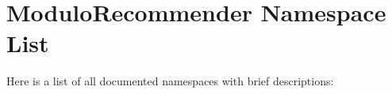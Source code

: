 \section{ModuloRecommender Namespace List}
Here is a list of all documented namespaces with brief descriptions:\begin{CompactList}
\item{}
\end{CompactList}
